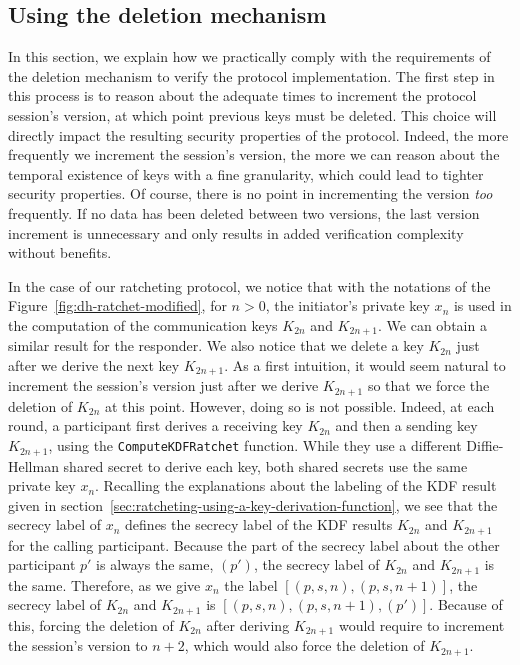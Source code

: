 \subsection{Using the deletion mechanism}

In this section, we explain how we practically comply with the requirements of the deletion mechanism to verify the protocol implementation.
The first step in this process is to reason about the adequate times to increment the protocol session's version, at which point previous keys must be deleted.
This choice will directly impact the resulting security properties of the protocol.
Indeed, the more frequently we increment the session's version, the more we can reason about the temporal existence of keys with a fine granularity, which could lead to tighter security properties.
Of course, there is no point in incrementing the version \emph{too} frequently.
If no data has been deleted between two versions, the last version increment is unnecessary and only results in added verification complexity without benefits.

In the case of our ratcheting protocol, we notice that with the notations of the Figure~\ref{fig:dh-ratchet-modified}, for $n>0$, the initiator's private key $x_n$ is used in the computation of the communication keys $K_{2n}$ and $K_{2n+1}$. We can obtain a similar result for the responder.
We also notice that we delete a key $K_{2n}$ just after we derive the next key $K_{2n+1}$.
As a first intuition, it would seem natural to increment the session's version just after we derive $K_{2n+1}$ so that we force the deletion of $K_{2n}$ at this point.
However, doing so is not possible.
Indeed, at each round, a participant first derives a receiving key $K_{2n}$ and then a sending key $K_{2n+1}$, using the \texttt{ComputeKDFRatchet} function.
While they use a different Diffie-Hellman shared secret to derive each key, both shared secrets use the same private key $x_n$.
Recalling the explanations about the labeling of the KDF result given in section~\ref{sec:ratcheting-using-a-key-derivation-function}, we see that the secrecy label of $x_{n}$ defines the secrecy label of the KDF results $K_{2n}$ and $K_{2n+1}$ for the calling participant.
Because the part of the secrecy label about the other participant $p'$ is always the same, $(p')$, the secrecy label of $K_{2n}$ and $K_{2n+1}$ is the same.
Therefore, as we give $x_{n}$ the label $[(p,s,n),(p,s,n+1)]$, the secrecy label of $K_{2n}$ and $K_{2n+1}$ is $[(p,s,n),(p,s,n+1),(p')]$.
Because of this, forcing the deletion of $K_{2n}$ after deriving $K_{2n+1}$ would require to increment the session's version to $n+2$, which would also force the deletion of $K_{2n+1}$.

